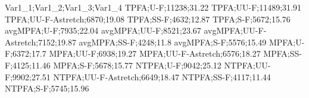 Var1_1;Var1_2;Var1_3;Var1_4
TPFA;U-F;11238;31.22
TPFA;UU-F;11489;31.91
TPFA;UU-F-Astretch;6870;19.08
TPFA;SS-F;4632;12.87
TPFA;S-F;5672;15.76
avgMPFA;U-F;7935;22.04
avgMPFA;UU-F;8521;23.67
avgMPFA;UU-F-Astretch;7152;19.87
avgMPFA;SS-F;4248;11.8
avgMPFA;S-F;5576;15.49
MPFA;U-F;6372;17.7
MPFA;UU-F;6938;19.27
MPFA;UU-F-Astretch;6576;18.27
MPFA;SS-F;4125;11.46
MPFA;S-F;5678;15.77
NTPFA;U-F;9042;25.12
NTPFA;UU-F;9902;27.51
NTPFA;UU-F-Astretch;6649;18.47
NTPFA;SS-F;4117;11.44
NTPFA;S-F;5745;15.96
